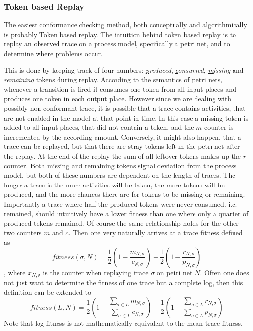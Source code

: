 \documentclass[runningheads]{template/llncs}
\begin{document}
\subsubsection{Token based Replay}

The easiest conformance checking method, both conceptually and algorithmically is probably Token based replay.
The intuition behind token based replay is to replay an observed trace on a process model, specifically a petri net, and to determine where problems occur.

This is done by keeping track of four numbers: \emph{\underline{p}roduced}, \emph{\underline{c}onsumed}, \emph{\underline{m}issing} and \emph{\underline{r}emaining} tokens during replay.
According to the semantics of petri nets, whenever a transition is fired it consumes one token from all input places and produces one token in each output place.
However since we are dealing with possibly non-conformant trace, it is possible that a trace contains activities, that are not enabled in the model at that point in time.
In this case a missing token is added to all input places, that did not contain a token, and the $m$ counter is incremented by the according amount.
Conversely, it might also happen, that a trace can be replayed, but that there are stray tokens left in the petri net after the replay. 
At the end of the replay the sum of all leftover tokens makes up the $r$ counter.
Both missing and remaining tokens signal deviation from the process model, but both of these numbers are dependent on the length of traces.
The longer a trace is the more activities will be taken, the more tokens will be produced, and the more chances there are for tokens to be missing or remaining.
Importantly a trace where half the produced tokens were never consumed, i.e. remained, should intuitively have a lower fitness than one where only a quarter of produced tokens remained.
Of course the same relationship holds for the other two counters $m$ and $c$.
Then one very naturally arrives at a trace fitness defined as 
\begin{equation}
fitness(σ,N) = \frac{1}{2}(1-\frac{m_{N,σ}}{c_{N,σ}})+\frac{1}{2}(1-\frac{r_{N,σ}}{p_{N,σ}})
\end{equation}
, where $x_{N,σ}$ is the counter when replaying trace $σ$ on petri net $N$.
Often one does not just want to determine the fitness of one trace but a complete log, then this definition can be extended to 
\begin{equation}
	fitness(L,N) = \frac{1}{2}(1-\frac{\sum_{σ\in L}m_{N,σ}}{\sum_{σ\in L}c_{N,σ}})+\frac{1}{2}(1-\frac{\sum_{σ\in L}r_{N,σ}}{\sum_{σ\in L}p_{N,σ}})
\end{equation}
Note that log-fitness is not mathematically equivalent to the mean trace fitness.
\end{document}
